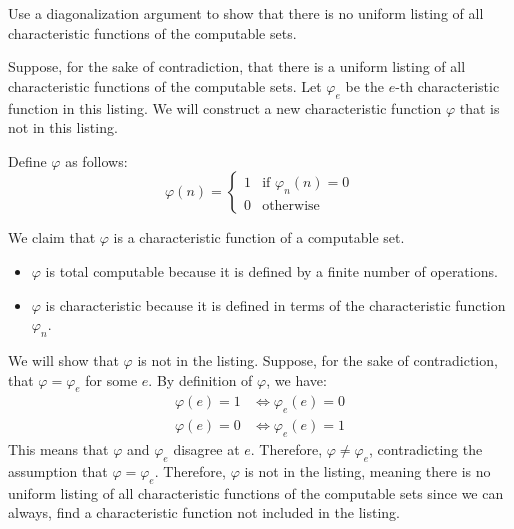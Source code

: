 \begin{problem}
  Use a diagonalization argument to show that there is no
  uniform listing of all characteristic functions
  of the computable sets.

  \begin{answer}
    Suppose, for the sake of contradiction, that there is a uniform listing of all characteristic functions of the computable sets.
    Let $\varphi_e$ be the $e$-th characteristic function in this listing.
    We will construct a new characteristic function $\varphi$ that is not in this listing.

    Define $\varphi$ as follows:
    \[
      \varphi(n) = \begin{cases}
        1 & \text{if } \varphi_n(n) = 0 \\
        0 & \text{otherwise}
      \end{cases}
    \]

    We claim that $\varphi$ is a characteristic function of a computable set.
    \begin{itemize}
      \item $\varphi$ is total computable because it is defined by a finite number of operations.
      \item $\varphi$ is characteristic because it is defined in terms of the characteristic function $\varphi_n$.
    \end{itemize}

    We will show that $\varphi$ is not in the listing.
    Suppose, for the sake of contradiction, that $\varphi = \varphi_e$ for some $e$.
    By definition of $\varphi$, we have:
    \begin{align*}
      \varphi(e) = 1 &\iff \varphi_e(e) = 0 \\
      \varphi(e) = 0 &\iff \varphi_e(e) = 1
    \end{align*}
    This means that $\varphi$ and $\varphi_e$ disagree at $e$.
    Therefore, $\varphi \neq \varphi_e$, contradicting the assumption that $\varphi = \varphi_e$.
    Therefore, $\varphi$ is not in the listing, meaning
    there is no uniform listing of all characteristic functions of the computable sets
    since we can always, find a characteristic function not included in the listing.
  \end{answer}
\end{problem}

